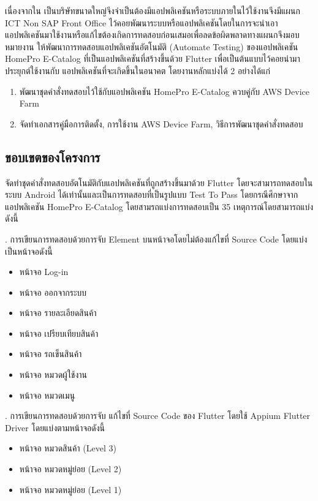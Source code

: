     เนื่องจากใน {\Company} เป็นบริษัทขนาดใหญ่จึงจำเป็นต้องมีแอปพลิเคชันหรือระบบภายในไว้ใช้งานจึงมีแผนก ICT Non SAP Front Office
    ไว้คอยพัฒนาระบบหรือแอปพลิเคชันโดยในการจะนำเอาแอปพลิเคชันมาใช้งานหรือแก้ไขต้องเกิดการทดสอบก่อนเสมอเพื่อลดข้อผิดพลาดทางแผนกจึงมอบหมายงาน
    ให้พัฒนาการทดสอบแอปพลิเคชันอัตโนมัติ (Automate Testing) ของแอปพลิเคชัน HomePro E-Catalog ที่เป็นแอปพลิเคชันที่สร้างขึ้นด้วย Flutter เพื่อเป็นต้นแบบไว้คอยนำมาประยุกต์ใช้งานกับ
    แอปพลิเคชันที่จะเกิดขึ้นในอนาคต โดยงานหลักแบ่งได้ 2 อย่างได้แก่
    
    \begin{enumerate}
        \item พัฒนาชุดคำสั่งทดสอบไว้ใช้กับแอปพลิเคชัน HomePro E-Catalog ควบคู่กับ AWS Device Farm
        \item จัดทำเอกสารคู่มือการติดตั้ง, การใช้งาน AWS Device Farm, วิธีการพัฒนาชุดคำสั่งทดสอบ
    \end{enumerate}

    \subsection{ขอบเขตของโครงการ}
        จัดทำชุดคำสั่งทดสอบอัตโนมัติกับแอปพลิเคชันที่ถูกสร้างขึ้นมาด้วย Flutter โดยจะสามารถทดสอบในระบบ Android ได้เท่านั้นและเป็นการทดสอบที่เป็นรูปแบบ Test To Pass โดยกรณีศึกษาจากแอปพลิเคชัน HomePro E-Catalog
        โดยสามรถแบ่งการทดสอบเป็น 35 เหตุการณ์โดยสามารถแบ่งดังนี้
        
        . การเขียนการทดสอบด้วยการจับ Element บนหน้าจอโดยไม่ต้องแก้ไขที่ Source Code โดยแบ่งเป็นหน้าจอดังนี้
            \begin{itemize}
                \item หน้าจอ Log-in
                \item หน้าจอ ออกจากระบบ
                \item หน้าจอ รายละเอียดสินค้า
                \item หน้าจอ เปรียบเทียบสินค้า
                \item หน้าจอ รถเข็นสินค้า
                \item หน้าจอ หมวดผู้ใช้งาน
                \item หน้าจอ หมวดเมนู
            \end{itemize}

        . การเขียนการทดสอบด้วยการจับ แก้ไขที่ Source Code ของ Flutter โดยใช้ Appium Flutter Driver โดยแบ่งตามหน้าจอดังนี้
            \begin{itemize}
                \item หน้าจอ หมวดสินค้า (Level 3)
                \item หน้าจอ หมวดหมู่ย่อย (Level 2)
                \item หน้าจอ หมวดหมู่ย่อย (Level 1)
            \end{itemize}

